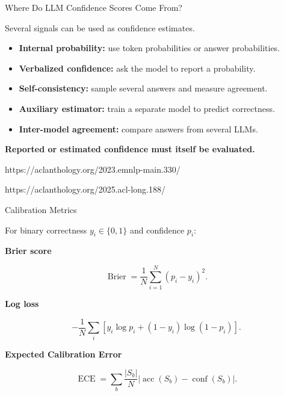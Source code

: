 \documentclass[11pt,compress,t,notes=noshow, xcolor=table]{beamer}
\begin{document}
\begin{vbframe}{Where Do LLM Confidence Scores Come From?}

Several signals can be used as confidence estimates.

\begin{itemize}
    \item \textbf{Internal probability:}
          use token probabilities or answer probabilities.
    \item \textbf{Verbalized confidence:}
          ask the model to report a probability.
    \item \textbf{Self-consistency:}
          sample several answers and measure agreement.
    \item \textbf{Auxiliary estimator:}
          train a separate model to predict correctness.
    \item \textbf{Inter-model agreement:}
          compare answers from several LLMs.
\end{itemize}

\begin{center}
\textbf{Reported or estimated confidence must itself be evaluated.}
\end{center}

{https://aclanthology.org/2023.emnlp-main.330/}

{https://aclanthology.org/2025.acl-long.188/}

\end{vbframe}



\begin{vbframe}{Calibration Metrics}

For binary correctness $y_i\in\{0,1\}$ and confidence $p_i$:

\textbf{Brier score}

\[
\operatorname{Brier}
=
\frac{1}{N}
\sum_{i=1}^{N}
(p_i-y_i)^2.
\]

\textbf{Log loss}

\[
-\frac{1}{N}
\sum_i
\left[
y_i\log p_i+
(1-y_i)\log(1-p_i)
\right].
\]

\textbf{Expected Calibration Error}

\[
\operatorname{ECE}
=
\sum_b
\frac{|S_b|}{N}
\left|
\operatorname{acc}(S_b)-\operatorname{conf}(S_b)
\right|.
\]

\end{vbframe}
\end{document}
